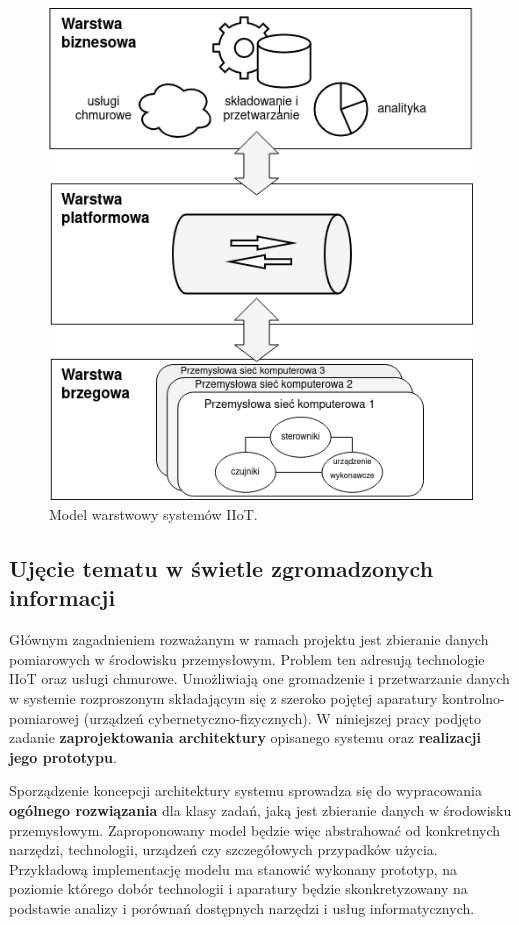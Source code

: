 \documentclass[a4paper, 12pt, twoside]{article}
\begin{document}
\begin{figure}
      \centering
      \includegraphics[scale=0.50]{iiot_arch.png}
      \caption{Model warstwowy systemów IIoT.}
      \label{fig:iiot-arch}
\end{figure}



\subsection{Ujęcie tematu w świetle zgromadzonych informacji}

Głównym zagadnieniem rozważanym
w ramach projektu jest zbieranie danych pomiarowych w środowisku
przemysłowym. Problem ten adresują technologie IIoT oraz usługi chmurowe.
Umożliwiają one gromadzenie i przetwarzanie danych w systemie rozproszonym składającym
się z szeroko pojętej aparatury kontrolno-pomiarowej (urządzeń cybernetyczno-fizycznych).
W niniejszej pracy podjęto zadanie \textbf{zaprojektowania architektury} opisanego systemu
oraz \textbf{realizacji jego prototypu}.

Sporządzenie koncepcji architektury systemu sprowadza się do wypracowania
\textbf{ogólnego rozwiązania} dla klasy zadań, jaką jest zbieranie danych w środowisku przemysłowym.
Zaproponowany model będzie więc abstrahować od konkretnych narzędzi, technologii,
urządzeń czy szczegółowych przypadków użycia. Przykładową implementację modelu ma
stanowić wykonany prototyp, na poziomie którego dobór technologii
i aparatury będzie skonkretyzowany na podstawie analizy i porównań dostępnych
narzędzi i usług informatycznych.
\end{document}
